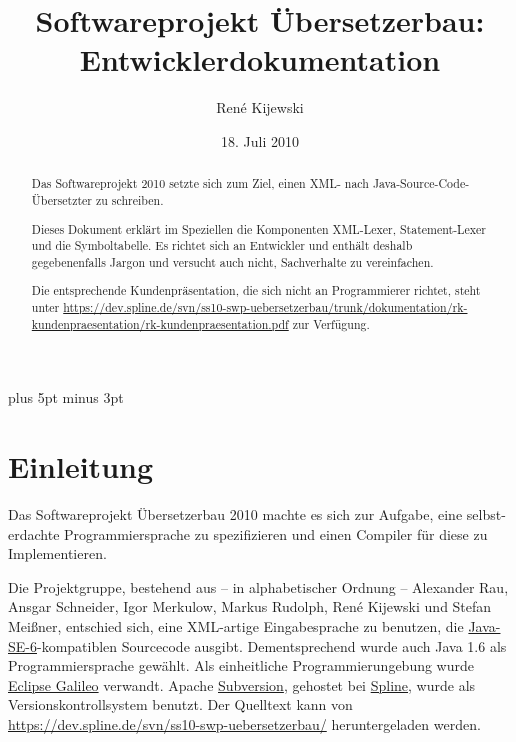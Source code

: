 \documentclass[10pt,a4paper,ngerman,titlepage,tocindentauto]{article}
\newcommand{\link}[1]{\href{#1}{#1}}
\begin{document}
	\begin{titlepage}
		\title{Softwareprojekt Übersetzerbau: \\ Entwicklerdokumentation} 
		\author{René Kijewski} 
		\date{18. Juli 2010}
		
		\maketitle
	\end{titlepage}
	
	\begin{abstract}
		Das Softwareprojekt 2010 setzte sich zum Ziel, einen XML- nach Java-Source-Code-Übersetzter
		zu schreiben.
		
		Dieses Dokument erklärt im Speziellen die Komponenten XML-Lexer, Statement-Lexer
		und die Symboltabelle. Es richtet sich an Entwickler und enthält deshalb gegebenenfalls
		Jargon und versucht auch nicht, Sachverhalte zu vereinfachen.
		
		Die entsprechende Kundenpräsentation, die sich nicht an Programmierer richtet, steht unter
		\link{https://dev.spline.de/svn/ss10-swp-uebersetzerbau/trunk/dokumentation/rk-kundenpraesentation/rk-kundenpraesentation.pdf}
		zur Verfügung.
	\end{abstract}

	{
		\pagestyle{empty}
		\tableofcontents
		\newpage
	}
	
	\parskip 7pt plus 5pt minus 3pt
	\setcounter{page}{1}
	\section{Einleitung}
		Das Softwareprojekt Übersetzerbau 2010 machte es sich zur Aufgabe, eine selbst-erdachte Programmiersprache
		zu spezifizieren und einen Compiler für diese zu Implementieren.
		
		Die Projektgruppe, bestehend aus – in alphabetischer Ordnung –
			Alexander Rau,
			Ansgar Schneider,
			Igor Merkulow,
			Markus Rudolph,
			René Kijewski und
			Stefan Meißner,
		entschied sich, eine XML-artige Eingabesprache zu benutzen, die
		\href{http://java.sun.com/javase/6/}{Java-SE-6}-kompatiblen Sourcecode ausgibt.
		Dementsprechend wurde auch Java 1.6 als Programmiersprache gewählt.
		Als einheitliche Programmierungebung wurde \href{http://www.eclipse.org/galileo/}{Eclipse Galileo} verwandt.
		Apache \href{http://subversion.apache.org/}{Subversion}, gehostet bei \href{http://dev.spline.de/}{Spline}, wurde als
		Versionskontrollsystem benutzt. Der Quelltext kann von \link{https://dev.spline.de/svn/ss10-swp-uebersetzerbau/}
		heruntergeladen werden.
		
\end{document}
